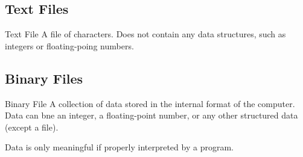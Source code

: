 \documentclass[\main/notes.tex]{subfiles}
\begin{document}
			\subsection{Text Files}
				\begin{definition}{Text File}
					A file of characters. Does not contain any data structures, such as integers or floating-poing numbers.
				\end{definition}
			\subsection{Binary Files}
				\begin{definition}{Binary File}
					A collection of data stored in the internal format of the computer. Data can bne an integer, a floating-point number, or any other structured data (except a file).

					Data is only meaningful if properly interpreted by a program.
				\end{definition}

\end{document}
